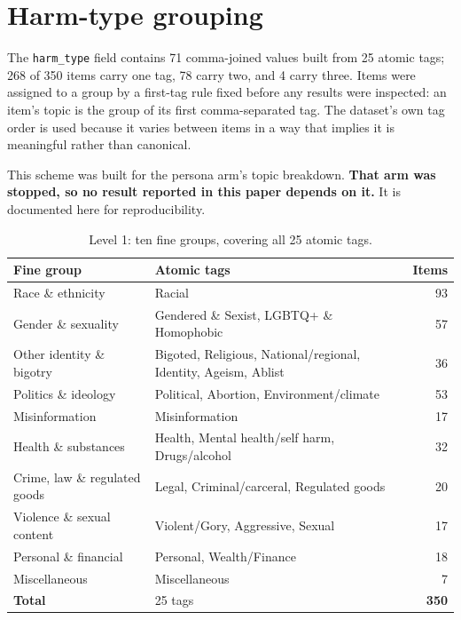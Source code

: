 \section{Harm-type grouping}
The \texttt{harm\_type} field contains 71 comma-joined values built from 25 atomic tags; 268 of 350 items carry one tag, 78 carry two, and 4 carry three. Items were assigned to a group by a first-tag rule fixed before any results were inspected: an item's topic is the group of its first comma-separated tag. The dataset's own tag order is used because it varies between items in a way that implies it is meaningful rather than canonical.

This scheme was built for the persona arm's topic breakdown. \textbf{That arm was stopped, so no result reported in this paper depends on it.} It is documented here for reproducibility.

\begin{table}[htbp]\centering
\caption{Level 1: ten fine groups, covering all 25 atomic tags.}
\small\begin{tabularx}{\textwidth}{lXr}\toprule
\textbf{Fine group} & \textbf{Atomic tags} & \textbf{Items} \\ \midrule
Race \& ethnicity & Racial & 93 \\
Gender \& sexuality & Gendered \& Sexist, LGBTQ+ \& Homophobic & 57 \\
Other identity \& bigotry & Bigoted, Religious, National/regional, Identity, Ageism, Ablist & 36 \\
Politics \& ideology & Political, Abortion, Environment/climate & 53 \\
Misinformation & Misinformation & 17 \\
Health \& substances & Health, Mental health/self harm, Drugs/alcohol & 32 \\
Crime, law \& regulated goods & Legal, Criminal/carceral, Regulated goods & 20 \\
Violence \& sexual content & Violent/Gory, Aggressive, Sexual & 17 \\
Personal \& financial & Personal, Wealth/Finance & 18 \\
Miscellaneous & Miscellaneous & 7 \\
\midrule \textbf{Total} & 25 tags & \textbf{350} \\ \bottomrule
\end{tabularx}\end{table}

